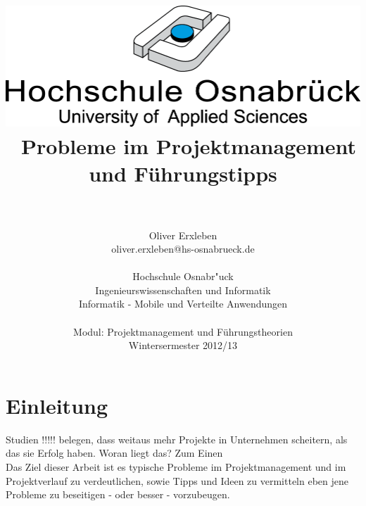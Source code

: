 \documentclass[11pt]{scrartcl}
\begin{document}
\author{\\ \\ Oliver Erxleben \\ oliver.erxleben@hs-osnabrueck.de 
\\ \\ Hochschule Osnabr"uck \\
Ingenieurswissenschaften und Informatik \\ Informatik - Mobile und Verteilte Anwendungen
\\ \\ Modul: Projektmanagement und Führungstheorien \\ Wintersermester 2012/13 }

\title{\includegraphics[scale=0.75,keepaspectratio]{img/hs_os.png}\linebreak \linebreak
\\ \ Probleme im Projektmanagement und Führungstipps}

\maketitle
\thispagestyle{empty}

\pagebreak

\tableofcontents

\thispagestyle{empty}
\pagebreak

\pagestyle{fancy}
\setcounter{page}{1} 
\section{Einleitung}
Studien !!!!! belegen, dass weitaus mehr Projekte in Unternehmen scheitern, als das sie Erfolg haben. Woran liegt das? Zum Einen 
\\
Das Ziel dieser Arbeit ist es typische Probleme im Projektmanagement und im Projektverlauf zu verdeutlichen, sowie Tipps und Ideen zu vermitteln eben jene Probleme zu beseitigen - oder besser - vorzubeugen.

\cite{tipps_zum_pm}
\end{document}

